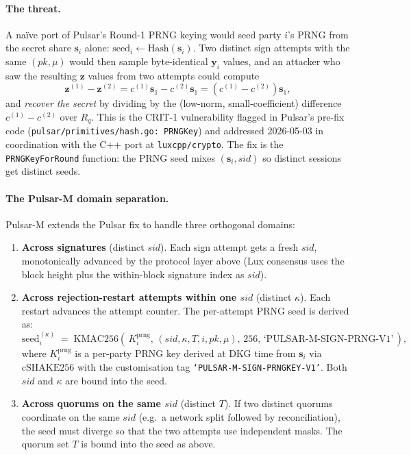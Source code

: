 \documentclass[11pt,a4paper]{article}
\theoremstyle{definition}
\theoremstyle{remark}
\newcommand{\Rq}{R_q}
\newcommand{\cSHAKE}{\mathrm{cSHAKE256}}
\newcommand{\KMAC}{\mathrm{KMAC256}}
\begin{document}
\paragraph{The threat.}
A na\"ive port of Pulsar's Round-1 PRNG keying would seed party
$i$'s PRNG from the secret share $\mathbf{s}_i$ alone:
\(
\text{seed}_i \gets \text{Hash}(\mathbf{s}_i)
\).
Two distinct sign attempts with the same $(\mathit{pk}, \mu)$ would
then sample byte-identical $\mathbf{y}_i$ values, and an attacker
who saw the resulting $\mathbf{z}$ values from two attempts could
compute
\[
\mathbf{z}^{(1)} - \mathbf{z}^{(2)} = c^{(1)} \mathbf{s}_1 - c^{(2)} \mathbf{s}_1
= (c^{(1)} - c^{(2)}) \mathbf{s}_1,
\]
and \emph{recover the secret} by dividing by the (low-norm,
small-coefficient) difference $c^{(1)} - c^{(2)}$ over $\Rq$. This is
the CRIT-1 vulnerability flagged in Pulsar's pre-fix code
(\texttt{pulsar/primitives/hash.go: PRNGKey}) and addressed
2026-05-03 in coordination with the C++ port at
\texttt{luxcpp/crypto}. The fix is the
\texttt{PRNGKeyForRound} function: the PRNG seed mixes
$(\mathbf{s}_i, \mathit{sid})$ so distinct sessions get distinct
seeds.

\paragraph{The Pulsar-M domain separation.}
Pulsar-M extends the Pulsar fix to handle three orthogonal
domains:

\begin{enumerate}[leftmargin=*, itemsep=0pt]
\item \textbf{Across signatures} (distinct $\mathit{sid}$). Each
sign attempt gets a fresh $\mathit{sid}$, monotonically advanced
by the protocol layer above (Lux consensus uses the block height
plus the within-block signature index as $\mathit{sid}$).
\item \textbf{Across rejection-restart attempts within one
$\mathit{sid}$} (distinct $\kappa$). Each restart advances the
attempt counter. The per-attempt PRNG seed is derived as:
\[
\text{seed}_i^{(\kappa)} \;=\;
\KMAC(\,K_i^{\mathrm{prng}},\,
(\mathit{sid}, \kappa, T, i, \mathit{pk}, \mu),\,
256,\,
\text{`PULSAR-M-SIGN-PRNG-V1'}\,),
\]
where $K_i^{\mathrm{prng}}$ is a per-party PRNG key derived at DKG
time from $\mathbf{s}_i$ via $\cSHAKE$ with the customisation tag
\texttt{`PULSAR-M-SIGN-PRNGKEY-V1'}. Both $\mathit{sid}$ and $\kappa$
are bound into the seed.
\item \textbf{Across quorums on the same $\mathit{sid}$} (distinct
$T$). If two distinct quorums coordinate on the same $\mathit{sid}$
(e.g.\ a network split followed by reconciliation), the seed must
diverge so that the two attempts use independent masks. The
quorum set $T$ is bound into the seed as above.
\end{enumerate}
\end{document}
